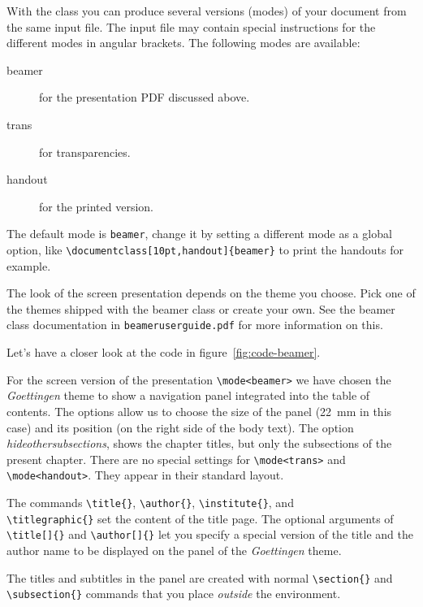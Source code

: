 With the  class you can produce several versions (modes) of your
document from the same input file. The input file may contain special
instructions for the different modes in angular brackets. The
following modes are available:
\begin{description}
\item[beamer] for the presentation PDF
  discussed above.
\item[trans] for transparencies.
\item[handout] for the printed version.
\end{description}
The default mode is \texttt{beamer}, change it by setting a
different mode as a global option, like
\verb|\documentclass[10pt,handout]{beamer}| to print the handouts for
example.

The look of the screen presentation depends on the theme you choose. Pick one of the themes shipped with the beamer class or
create your own. See the beamer class documentation in
\texttt{beameruserguide.pdf} for more information on this.

Let's have a closer look at the code in figure~\ref{fig:code-beamer}.

For the screen version of the presentation \verb|\mode<beamer>| we
have chosen the \emph{Goettingen} theme to show a navigation panel
integrated into the table of contents. The options allow us to choose the
size of the panel (22~mm in this case) and its position (on the right
side of the body text). The option \emph{hideothersubsections}, shows
the chapter titles, but only the subsections of the present
chapter. There are no special settings for \verb|\mode<trans>| and
\verb|\mode<handout>|. They appear in their standard layout.

The commands \verb|\title{}|, \verb|\author{}|, \verb|\institute{}|,
and\\ \verb|\titlegraphic{}| set the content of the title page. The
optional arguments of \verb|\title[]{}| and \verb|\author[]{}|
let you specify a special version of the title and the author
name to be displayed on the panel of the \emph{Goettingen} theme.

The titles and subtitles in the panel are created with normal
\verb|\section{}| and \verb|\subsection{}| commands that you place
\emph{outside} the  environment.

